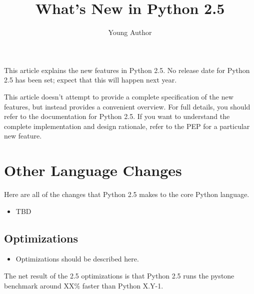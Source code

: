 \documentclass{howto}
\title{What's New in Python 2.5}
\author{Young Author}
\begin{document}
\maketitle
\tableofcontents

This article explains the new features in Python 2.5.  No release date
for Python 2.5 has been set; expect that this will happen next year.


This article doesn't attempt to provide a complete specification of
the new features, but instead provides a convenient overview.  For
full details, you should refer to the documentation for Python 2.5.
If you want to understand the complete implementation and design
rationale, refer to the PEP for a particular new feature.





\section{Other Language Changes}

Here are all of the changes that Python 2.5 makes to the core Python
language.

\begin{itemize}
\item TBD

\end{itemize}


\subsection{Optimizations}

\begin{itemize}

\item Optimizations should be described here.

\end{itemize}

The net result of the 2.5 optimizations is that Python 2.5 runs the
pystone benchmark around XX\% faster than Python X.Y-1.%
\end{document}
